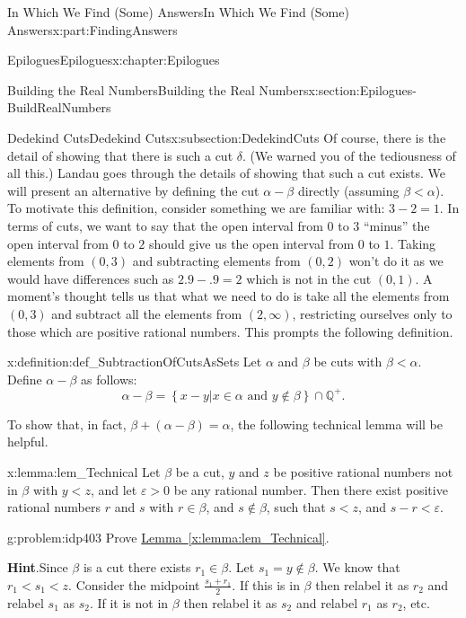 \documentclass[oneside,10pt,]{book}
\newcommand{\blocktitlefont}{\relax}
\newcommand{\xreffont}{\relax}
\numberwithin{equation}{section}
\newcommand{\eps}{\varepsilon}
\newcommand{\QQ}{\mathbb {Q}}
\newcommand{\lt}{<}
\begin{document}
\begin{partptx}{In Which We Find (Some) Answers}{}{In Which We Find (Some) Answers}{}{}{x:part:FindingAnswers}
\begin{chapterptx}{Epilogues}{}{Epilogues}{}{}{x:chapter:Epilogues}
\begin{sectionptx}{Building the Real Numbers}{}{Building the Real Numbers}{}{}{x:section:Epilogues-BuildRealNumbers}
\begin{subsectionptx}{Dedekind Cuts}{}{Dedekind Cuts}{}{}{x:subsection:DedekindCuts}
Of course, there is the detail of showing that there is such a cut \(\delta\). (We warned you of the tediousness of all this.) Landau goes through the details of showing that such a cut exists. We will present an alternative by defining the cut \(\alpha-\beta\) directly (assuming \(\beta\lt \alpha\)). To motivate this definition, consider something we are familiar with: \(3-2=1\). In terms of cuts, we want to say that the open interval from \(0\) to \(3\) ``minus'' the open interval from \(0\) to \(2\) should give us the open interval from \(0\) to \(1\). Taking elements from \((0,3)\) and subtracting elements from \((0,2)\) won't do it as we would have differences such as \(2.9-.9=2\) which is not in the cut \((0,1)\). A moment's thought tells us that what we need to do is take all the elements from \((0,3)\) and subtract all the elements from \((2,\infty)\), restricting ourselves only to those which are positive rational numbers. This prompts the following definition.%
\begin{definition}{}{x:definition:def_SubtractionOfCutsAsSets}%
 Let \(\alpha\) and \(\beta\) be cuts with \(\beta\lt \alpha\). Define \(\alpha-\beta\) as follows:%
\begin{equation*}
\alpha-\beta =\left\{x-y|x\in\alpha \text{ and } y\not\in\beta\right\}\cap\QQ^+\text{.}
\end{equation*}
%
\end{definition}
To show that, in fact, \(\beta+(\alpha-\beta)=\alpha\), the following technical lemma will be helpful.%
\begin{lemma}{}{}{x:lemma:lem_Technical}%
Let \(\beta\) be a cut, \(y\) and \(z\) be positive rational numbers not in \(\beta\) with \(y\lt z\), and let \(\eps>0\) be any rational number. Then there exist positive rational numbers \(r\) and \(s\) with \(r\in\beta\), and \(s\not\in\beta\), such that \(s\lt z\), and \(s-r\lt \eps\).%
\end{lemma}
\begin{problem}{}{g:problem:idp403}%
Prove \hyperref[x:lemma:lem_Technical]{Lemma~{\xreffont\ref{x:lemma:lem_Technical}}}.%
\par\smallskip%
\noindent\textbf{\blocktitlefont Hint}.\hypertarget{g:hint:idp404}{}\quad{}Since \(\beta\) is a cut there exists \(r_1\in\beta\). Let \(s_1=y\not\in\beta\).  We know that \(r_1\lt s_1\lt
z\).  Consider the midpoint \(\frac{s_1+r_1}{2}\).  If this is in \(\beta\) then relabel it as \(r_2\) and relabel \(s_1\) as \(s_2\).  If it is not in \(\beta\) then relabel it as \(s_2\) and relabel \(r_1\) as \(r_2\), etc.%

\end{problem}
\end{subsectionptx}
\end{sectionptx}
\end{chapterptx}
\end{partptx}
\end{document}
